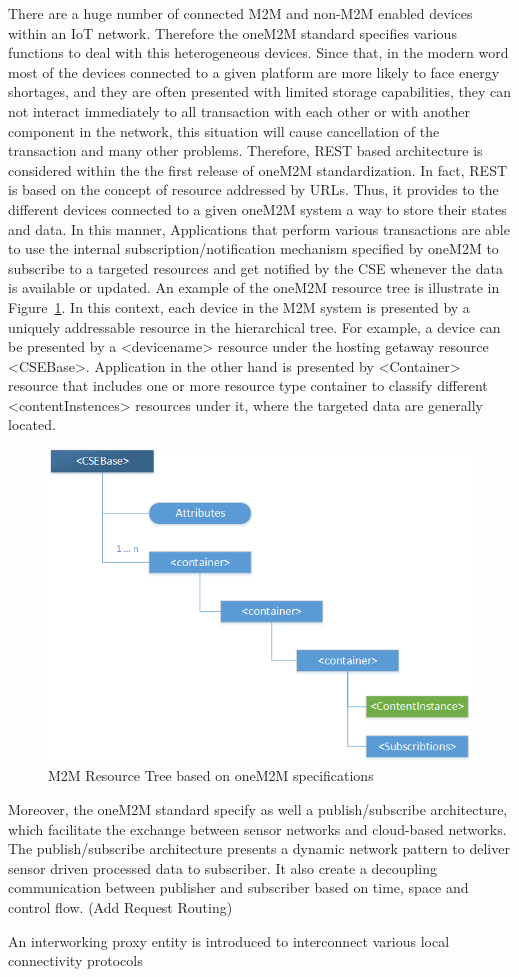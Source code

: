 There are a huge number of connected M2M and non-M2M enabled devices within an IoT network. Therefore the oneM2M standard specifies various functions to deal with this heterogeneous devices. Since that, in the modern word most of the devices connected to a given platform are more likely to face energy shortages, and they are often presented with limited storage capabilities, they can not interact immediately to all transaction with each other or with another component in the network, this situation will cause cancellation of the transaction and many other problems. Therefore, REST based architecture is considered within the the first release of oneM2M standardization. In fact, REST is based on the concept of resource addressed by URLs. Thus, it provides to the different devices connected to a given oneM2M system a way to store their states and data. In this manner, Applications that perform various transactions are able to use the internal subscription/notification mechanism specified by oneM2M to subscribe to a targeted resources and get notified by the CSE whenever the data is available or updated. An example of the oneM2M resource tree is illustrate in Figure~\ref{fig:contrib1:tree}. In this context, each device in the M2M system is presented by a uniquely addressable resource in the hierarchical tree. For example, a device can be presented by a <device\textunderscore name> resource under the hosting getaway resource <CSEBase>. Application in the other hand is presented by <Container> resource that includes one or more resource type container to classify different <contentInstences> resources under it, where the targeted data are generally located.\par
\begin{figure}[htbp]
    \centering
    \includegraphics[width=.8\textwidth]{resources/images/tree}
    \caption{M2M Resource Tree based on oneM2M specifications}\label{fig:contrib1:tree}
\end{figure}
Moreover, the oneM2M standard specify as well a publish/subscribe architecture, which facilitate the exchange between sensor networks and cloud-based networks. The publish/subscribe architecture presents a dynamic network pattern to deliver sensor driven processed data to subscriber. It also create a decoupling communication between publisher and subscriber based on time, space and control flow. (Add Request Routing)\par
An interworking proxy entity is introduced to interconnect various local connectivity protocols

